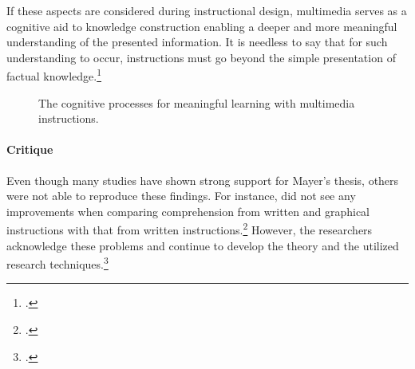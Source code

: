 If these aspects are considered during instructional design, multimedia serves as a cognitive aid to knowledge construction enabling a deeper and more meaningful understanding of the presented information. It is needless to say that for such understanding to occur, instructions must go beyond the simple presentation of factual knowledge.\footcites[Cf.][p.229]{MayerRotemeaningfullearning2002}

\begin{figure}[!htb]
    \centering
    
    \caption[The cognitive processes for meaningful learning with multimedia instructions.]{The cognitive processes for meaningful learning with multimedia instructions.\protect\footnotemark}
    \label{fig:CTML_process}
\end{figure}


\paragraph{Critique} Even though many studies have shown strong support for Mayer's thesis, others were not able to reproduce these findings. For instance, \cite{RaschInteractivenoninteractivepictures2009} did not see any improvements when comparing comprehension from written and graphical instructions with that from written instructions.\footcites[Cf.][]{RaschInteractivenoninteractivepictures2009} However, the researchers acknowledge these problems and continue to develop the theory and the utilized research techniques.\footcites[Cf.][p.52]{SordenCognitiveTheoryMultimedia2012} 

